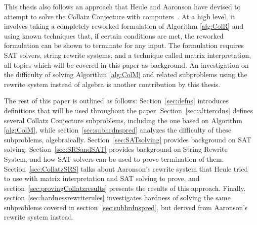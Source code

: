 This thesis also follows an approach that Heule and Aaronson have devised to attempt to solve the Collatz Conjecture with computers~\cite{HeuleAaronson}. At a high level, it involves taking a completely reworked formulation of Algorithm \ref{alg:ColR} and using known techniques that, if certain conditions are met, the reworked formulation can be shown to terminate for any input. The formulation requires SAT solvers, string rewrite systems, and a technique called matrix interpretation, all topics which will be covered in this paper as background. An investigation on the difficulty of solving Algorithm \ref{alg:ColM} and related subproblems using the rewrite system instead of algebra is another contribution by this thesis.\par
The rest of this paper is outlined as follows: Section~\ref{sec:defns} introduces definitions that will be used throughout the paper. Section~\ref{sec:alttercdns} defines several Collatz Conjecture subproblems, including the one based on Algorithm \ref{alg:ColM}, while section~\ref{sec:subhrdnspred} analyzes the difficulty of these subproblems, algebraically. Section~\ref{sec:SATsolving} provides background on SAT solving. Section~\ref{sec:SRSandSAT} provides background on String Rewrite System, and how SAT solvers can be used to prove termination of them. Section~\ref{sec:CollatzSRS} talks about Aaronson's rewrite system that Heule tried to use with matrix interpretation and SAT solving to prove, and section~\ref{sec:provingCollatzresults} presents the results of this approach. Finally, section~\ref{sec:hardnessrewriterules} investigates hardness of solving the same subproblems covered in section~\ref{sec:subhrdnspred}, but derived from Aaronson's rewrite system instead.


